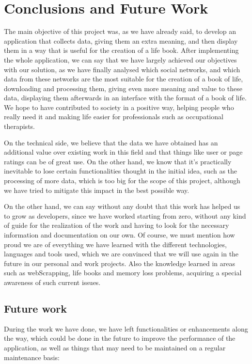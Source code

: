 \chapter{Conclusions and Future Work}
\label{cap:conclusions}

The main objective of this project was, as we have already said, to develop an application that collects data, giving them an extra meaning, and then display them in a way that is useful for the creation of a life book. After implementing the whole application, we can say that we have largely achieved our objectives with our solution, as we have finally analysed which social networks, and which data from these networks are the most suitable for the creation of a book of life, downloading and processing them, giving even more meaning and value to these data, displaying them afterwards in an interface with the format of a book of life. We hope to have contributed to society in a positive way, helping people who really need it and making life easier for professionals such as occupational therapists.

On the technical side, we believe that the data we have obtained has an additional value over existing work in this field and that things like user or page ratings can be of great use. On the other hand, we know that it's practically inevitable to lose certain functionalities thought in the initial idea, such as the processing of more data, which is too big for the scope of this project, although we have tried to mitigate this impact in the best possible way.

On the other hand, we can say without any doubt that this work has helped us to grow as developers, since we have worked starting from zero, without any kind of guide for the realization of the work and having to look for the necessary information and documentation on our own. Of course, we must mention how proud we are of everything we have learned with the different technologies, languages and tools used, which we are convinced that we will use again in the future in our personal and work projects. Also the knowledge learned in areas such as webScrapping, life books and memory loss problems, acquiring a special awareness of such current issues.

\section{Future work}

During the work we have done, we have left functionalities or enhancements along the way, which could be done in the future to improve the performance of the application, as well as things that may need to be maintained on a regular maintenance basis:

